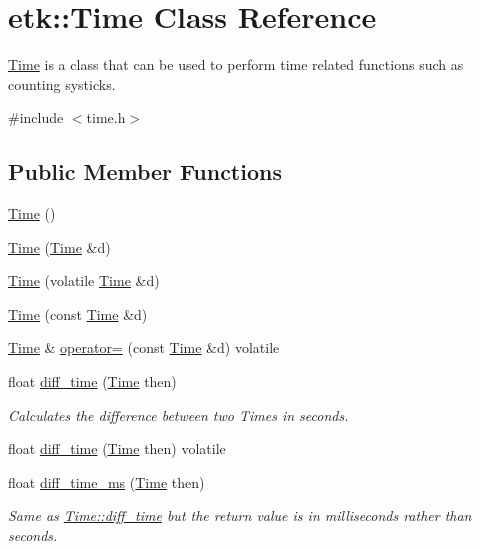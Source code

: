 \hypertarget{classetk_1_1_time}{\section{etk\-:\-:Time Class Reference}
\label{classetk_1_1_time}
}


\hyperlink{classetk_1_1_time}{Time} is a class that can be used to perform time related functions such as counting systicks.  




{\ttfamily \#include $<$time.\-h$>$}

\subsection*{Public Member Functions}
\begin{DoxyCompactItemize}
\item 
\hyperlink{classetk_1_1_time_adbc562f3fa83ca5ddbfe555fdffaf960}{Time} ()
\item 
\hyperlink{classetk_1_1_time_a4a1745140f96049c2465678511889cf1}{Time} (\hyperlink{classetk_1_1_time}{Time} \&d)
\item 
\hyperlink{classetk_1_1_time_acf7be97d9be2fa34c3d3a0615dbb0723}{Time} (volatile \hyperlink{classetk_1_1_time}{Time} \&d)
\item 
\hyperlink{classetk_1_1_time_acb4ed167da8affc51be79856cee22c29}{Time} (const \hyperlink{classetk_1_1_time}{Time} \&d)
\item 
\hyperlink{classetk_1_1_time}{Time} \& \hyperlink{classetk_1_1_time_ae78299592e099de6b3ea68399a88157b}{operator=} (const \hyperlink{classetk_1_1_time}{Time} \&d) volatile
\item 
float \hyperlink{classetk_1_1_time_a3dc63bf57c12403aeebb9e22e8578c73}{diff\-\_\-time} (\hyperlink{classetk_1_1_time}{Time} then)
\begin{DoxyCompactList}\small\item\em Calculates the difference between two Times in seconds. \end{DoxyCompactList}\item 
float \hyperlink{classetk_1_1_time_a95afcc242338836b77fd5ca6469577b1}{diff\-\_\-time} (\hyperlink{classetk_1_1_time}{Time} then) volatile
\item 
float \hyperlink{classetk_1_1_time_a4bf4d1de45b3a757186f662aa44c84fc}{diff\-\_\-time\-\_\-ms} (\hyperlink{classetk_1_1_time}{Time} then)
\begin{DoxyCompactList}\small\item\em Same as \hyperlink{classetk_1_1_time_a3dc63bf57c12403aeebb9e22e8578c73}{Time\-::diff\-\_\-time} but the return value is in milliseconds rather than seconds. \end{DoxyCompactList}\item 

\end{DoxyCompactItemize}
